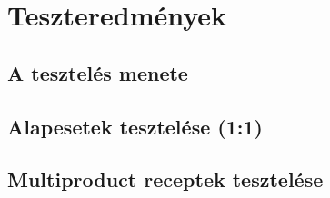\chapter{Teszteredmények}
\section{A tesztelés menete}
\section{Alapesetek tesztelése (1:1)}
\section{Multiproduct receptek tesztelése}